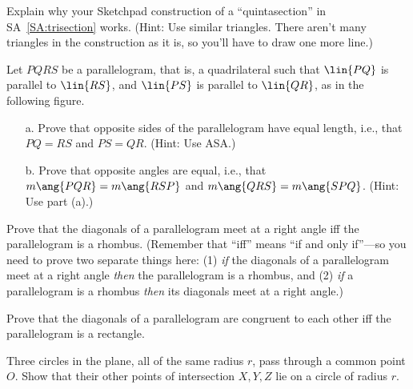 \begin{EG}
Explain why your Sketchpad construction of a ``quintasection'' in
SA~\ref{SA:trisection} works.  (Hint: Use similar triangles.
There aren't many triangles in the construction as it is,
so you'll have to draw one more line.)
\end{EG}


\begin{EG}
Let $PQRS$ be a parallelogram, that is, a quadrilateral such that
$\lin{PQ}$ is parallel to $\lin{RS}$, and 
$\lin{PS}$ is parallel to $\lin{QR}$, as in the following figure.
\begin{itemize}
\item[a.] Prove that opposite sides of the parallelogram have equal length,
i.e., that $PQ=RS$ and $PS=QR$.  (Hint: Use ASA.)
\item[b.] Prove that opposite angles are equal, i.e., that
$m\ang{PQR}=m\ang{RSP}$ and $m\ang{QRS}=m\ang{SPQ}$.  (Hint: Use part (a).)
\end{itemize}
\end{EG}

\begin{EG}
Prove that the diagonals of a parallelogram meet at a right angle
iff the parallelogram is a rhombus.  (Remember that ``iff''
means ``if and only if''---so you need to prove two separate things here:
(1) \emph{if} the diagonals of a parallelogram meet at a right angle
\emph{then} the parallelogram is a rhombus, and 
(2) \emph{if} a parallelogram is a rhombus
\emph{then} its diagonals meet at a right angle.)
\end{EG}

\begin{EG}
Prove that the diagonals of a parallelogram are congruent to each other
iff the parallelogram is a rectangle.
\end{EG}

\begin{EG}
Three circles in the plane, all of the same radius $r$, pass through
a common point $O$.  Show that their other points of intersection
$X,Y,Z$ lie on a circle of radius $r$.
\end{EG}

